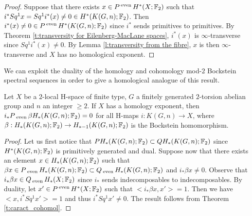 \begin{proof} %
Suppose that there exists $x\in P\operatorname{^{even}} H^*(X;\mathbb{F}_2)$ such that $i^*Sq^1x=Sq^1i^*(x)\not=0\in H^*(K(G,n);\mathbb{F}_2)$. Then $i^*(x)\not=0\in P\operatorname{^{even}} H^*(K(G,n);\mathbb{F}_2)$ since $i^*$ sends primitives to primitives. By Theorem \ref{t:transversity for Eilenberg-MacLane spaces}, $i^*(x)$ is $\infty$-transverse since $Sq^1i^*(x)\not=0$. By Lemma \ref{l:transversity from the fibre}, $x$ is then $\infty$-transverse and $X$ has no homological exponent.
\end{proof}

We can exploit the duality of the homology and cohomology mod-$2$ Bockstein spectral sequences in order to give a homological analogue of this result.

\begin{thm}\label{t:caract_homol}
Let $X$ be a $2$-local H-space of finite type, $G$ a finitely generated $2$-torsion abelian group and $n$ an integer $\geq2$. If $X$ has a homology exponent, then $i_*P\operatorname{_{even}} \beta H_*(K(G,n);\mathbb{F}_2)=0$ for all H-maps $i:K(G,n)\to X$, where $\beta:H_*(K(G,n);\mathbb{F}_2)\to H_{*-1}(K(G,n);\mathbb{F}_2)$ is the Bockstein homomorphism.
\end{thm}

\begin{proof} %
Let us first notice that $PH_*(K(G,n);\mathbb{F}_2)\subset QH_*(K(G,n);\mathbb{F}_2)$ since $H^*(K(G,n);\mathbb{F}_2)$ is primitively generated and dual. Suppose now that there exists an element $x\in H_*(K(G,n);\mathbb{F}_2)$ such that $\beta x\in P\operatorname{_{even}} H_*(K(G,n);\mathbb{F}_2)\subset Q\operatorname{_{even}} H_*(K(G,n);\mathbb{F}_2)$ and $i_*\beta x\not=0$. Observe that $i_*\beta x\in Q\operatorname{_{even}} H_*(X;\mathbb{F}_2)$ since $i_*$ sends indecomposables to indecomposables. By duality, let $x'\in P\operatorname{^{even}} H^*(X;\mathbb{F}_2)$ such that $<i_*\beta x,x'>=1$. Then we have $<x,i^*Sq^1x'>=1$ and thus $i^*Sq^1x'\not=0$. The result follows from Theorem \ref{t:caract_cohomol}.
\end{proof}

\endinput